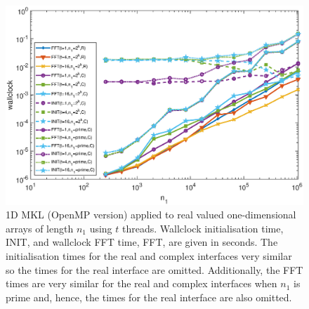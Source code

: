 \documentclass[a4]{article}
\begin{document}
\begin{figure}[!htbp]
\begin{center}
 \includegraphics[width=.9\textwidth, height=0.42\textheight]{MKL1D_OMP_threads_times_fig.eps}
\caption{1D MKL (OpenMP version) applied to real valued one-dimensional arrays of length $n_1$ using $t$ threads. Wallclock initialisation time, INIT, and wallclock FFT time, FFT, are given in seconds. The initialisation times for the real and complex interfaces very similar so the times for the real interface are omitted. Additionally, the FFT times are very similar for the real and complex interfaces when $n_1$ is prime and, hence, the times for the real interface are also omitted.}
\label{Fig:mkl1d_omp_threads_times}
\end{center}
\end{figure}
\end{document}
